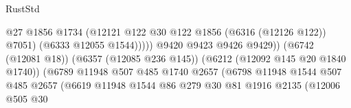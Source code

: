 \begin{lexlean}{RustStd}
\begin{coremodule}
                                                            @27
                                                            @1856
                                                            @1734
                                                            (@12121
                                                              @122
                                                              @30
                                                              @122
                                                              @1856
                                                              (@6316 (@12126 @122))
                                                              @7051)
                                                            (@6333 @12055 @1544)))))
                                                    @9420
                                                    @9423
                                                    @9426
                                                    @9429))
                                                (@6742 (@12081 @18))
                                                (@6357 (@12085 @236 @145))
                                                (@6212 (@12092 @145 @20 @1840 @1740))
                                                (@6789
                                                  @11948
                                                  @507
                                                  @485
                                                  @1740
                                                  @2657
                                                  (@6798
                                                    @11948
                                                    @1544
                                                    @507
                                                    @485
                                                    @2657
                                                    (@6619
                                                      @11948
                                                      @1544
                                                      @86
                                                      @279
                                                      @30
                                                      @81
                                                      @1916
                                                      @2135
                                                      (@12006
                                                        @505
                                                        @30

\end{coremodule}
\end{lexlean}
